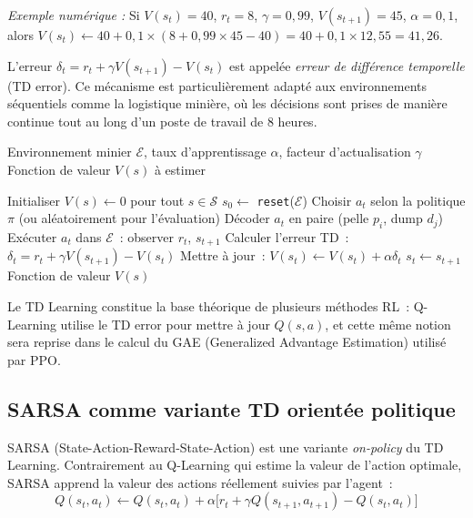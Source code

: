 \documentclass[11pt,a4paper]{report}
\begin{document}
\textit{Exemple numérique :} Si $V(s_t) = 40$, $r_t = 8$, $\gamma = 0{,}99$, $V(s_{t+1}) = 45$, $\alpha = 0{,}1$, alors $V(s_t) \leftarrow 40 + 0{,}1 \times (8 + 0{,}99 \times 45 - 40) = 40 + 0{,}1 \times 12{,}55 = 41{,}26$.

L'erreur $\delta_t = r_t + \gamma V(s_{t+1}) - V(s_t)$ est appelée \emph{erreur de différence temporelle} (TD error). Ce mécanisme est particulièrement adapté aux environnements séquentiels comme la logistique minière, où les décisions sont prises de manière continue tout au long d'un poste de travail de 8 heures.

\begin{algorithm}[H]
\caption{TD Learning pour le dispatching minier}
\label{alg:td-learning}
\begin{algorithmic}[1]

\REQUIRE Environnement minier $\mathcal{E}$, taux d'apprentissage $\alpha$, facteur d'actualisation $\gamma$
\REQUIRE Fonction de valeur $V(s)$ à estimer

\STATE Initialiser $V(s) \leftarrow 0$ pour tout $s \in \mathcal{S}$
    \STATE $s_0 \leftarrow$ \texttt{reset}($\mathcal{E}$) 
        \STATE Choisir $a_t$ selon la politique $\pi$ (ou aléatoirement pour l'évaluation)
        \STATE Décoder $a_t$ en paire (pelle $p_i$, dump $d_j$)
        \STATE Exécuter $a_t$ dans $\mathcal{E}$~: observer $r_t$, $s_{t+1}$
        \STATE Calculer l'erreur TD~: $\delta_t = r_t + \gamma V(s_{t+1}) - V(s_t)$
        \STATE Mettre à jour~: $V(s_t) \leftarrow V(s_t) + \alpha \delta_t$
        \STATE $s_t \leftarrow s_{t+1}$
    \ENDWHILE
\ENDFOR
\RETURN Fonction de valeur $V(s)$

\end{algorithmic}
\end{algorithm}

Le TD Learning constitue la base théorique de plusieurs méthodes RL~: Q-Learning utilise le TD error pour mettre à jour $Q(s, a)$, et cette même notion sera reprise dans le calcul du GAE (Generalized Advantage Estimation) utilisé par PPO.

\subsection{SARSA comme variante TD orientée politique}
\label{sec:sarsa}
SARSA (State-Action-Reward-State-Action) est une variante \emph{on-policy} du TD Learning. Contrairement au Q-Learning qui estime la valeur de l'action optimale, SARSA apprend la valeur des actions réellement suivies par l'agent~:
\begin{equation}
    Q(s_t, a_t) \leftarrow Q(s_t, a_t) + \alpha \Big[ r_t + \gamma Q(s_{t+1}, a_{t+1}) - Q(s_t, a_t) \Big]
    \label{eq:sarsa}
\end{equation}
\end{document}
